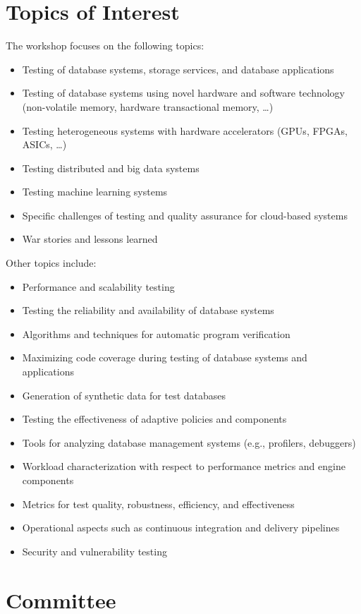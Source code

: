 \documentclass[sigconf]{acmart}
\begin{document}
\section{Topics of Interest}
The workshop focuses on the following topics:
\begin{itemize}
    \item Testing of database systems, storage services, and database applications 
    \item Testing of database systems using novel hardware and software technology (non-volatile memory, hardware transactional memory, \ldots{})
    \item Testing heterogeneous systems with hardware accelerators (GPUs, FPGAs, ASICs, …)
    \item Testing distributed and big data systems
    \item Testing machine learning systems
    \item Specific challenges of testing and quality assurance for cloud-based systems 
    \item War stories and lessons learned
\end{itemize}
Other topics include:
\begin{itemize}
    \item Performance and scalability testing
    \item Testing the reliability and availability of database systems 
    \item Algorithms and techniques for automatic program verification 
    \item Maximizing code coverage during testing of database systems and applications 
    \item Generation of synthetic data for test databases 
    \item Testing the effectiveness of adaptive policies and components 
    \item Tools for analyzing database management systems (e.g., profilers, debuggers)
    \item Workload characterization with respect to performance metrics and engine components 
    \item Metrics for test quality, robustness, efficiency, and effectiveness 
    \item Operational aspects such as continuous integration and delivery pipelines
    \item Security and vulnerability testing
\end{itemize}

\section{Committee}
\end{document}
